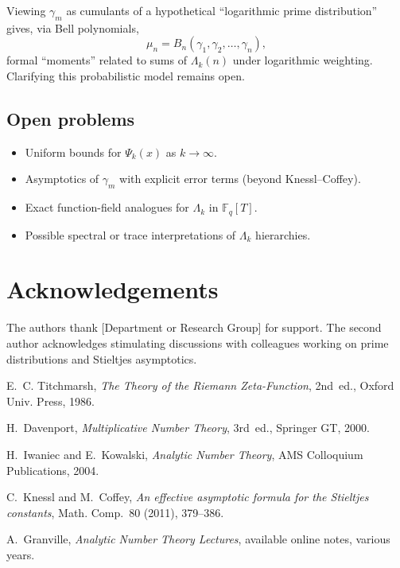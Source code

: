 \documentclass[12pt]{amsart}
\begin{document}
Viewing $\gamma_m$ as cumulants of a hypothetical ``logarithmic prime distribution'' gives, via Bell polynomials,
\[
\mu_n = B_n(\gamma_1,\gamma_2,\dots,\gamma_n),
\]
formal ``moments'' related to sums of $\Lambda_k(n)$ under logarithmic weighting.  Clarifying this probabilistic model remains open.

\subsection{Open problems}

\begin{itemize}
    \item Uniform bounds for $\Psi_k(x)$ as $k\to\infty$.
    \item Asymptotics of $\gamma_m$ with explicit error terms (beyond Knessl–Coffey).
    \item Exact function-field analogues for $\Lambda_k$ in $\mathbb{F}_q[T]$.
    \item Possible spectral or trace interpretations of $\Lambda_k$ hierarchies.
\end{itemize}

\section*{Acknowledgements}
The authors thank [Department or Research Group] for support. The second author acknowledges stimulating discussions with colleagues working on prime distributions and Stieltjes asymptotics.

\begin{thebibliography}{99}

E.~C. Titchmarsh, \emph{The Theory of the Riemann Zeta-Function}, 2nd~ed., Oxford Univ. Press, 1986.

H.~Davenport, \emph{Multiplicative Number Theory}, 3rd~ed., Springer GT, 2000.

H.~Iwaniec and E.~Kowalski, \emph{Analytic Number Theory}, AMS Colloquium Publications, 2004.

C.~Knessl and M.~Coffey, \emph{An effective asymptotic formula for the Stieltjes constants}, Math. Comp.~80 (2011), 379--386.

A.~Granville, \emph{Analytic Number Theory Lectures}, available online notes, various years.

\end{thebibliography}
\end{document}
